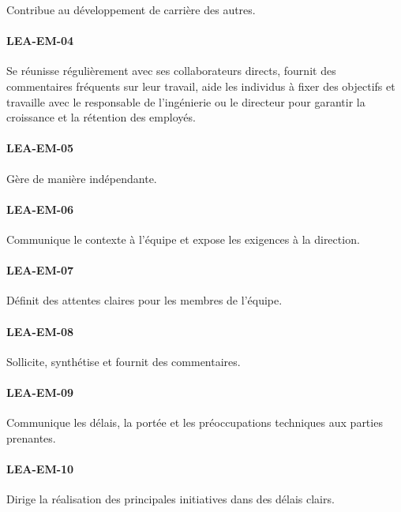 \documentclass[a4paper, french, openany, 12pt]{book}
\newcommand\cha[1]{\textcolor{OliveGreen}{\textbf{\uppercase{lea-{#1}}}}}
\begin{document}
\begin{multicols}{2}
  Contribue au développement de carrière des autres.
  
  \paragraph*{\cha{em-04}}

  Se réunisse régulièrement avec ses collaborateurs directs, fournit des commentaires fréquents sur leur travail, aide les
  individus à fixer des objectifs et travaille avec le responsable de l'ingénierie ou le directeur pour garantir la 
  croissance et la rétention des employés.

  \paragraph*{\cha{em-05}}

  Gère de manière indépendante.
  
  \paragraph*{\cha{em-06}}

  Communique le contexte à l'équipe et expose les exigences à la direction.

  \paragraph*{\cha{em-07}}

  Définit des attentes claires pour les membres de l'équipe.
  
  \paragraph*{\cha{em-08}}

  Sollicite, synthétise et fournit des commentaires.
  
  \paragraph*{\cha{em-09}}

  Communique les délais, la portée et les préoccupations techniques aux parties prenantes.
  
  \paragraph*{\cha{em-10}}

  Dirige la réalisation des principales initiatives dans des délais clairs.
  

\end{multicols}
\end{document}
